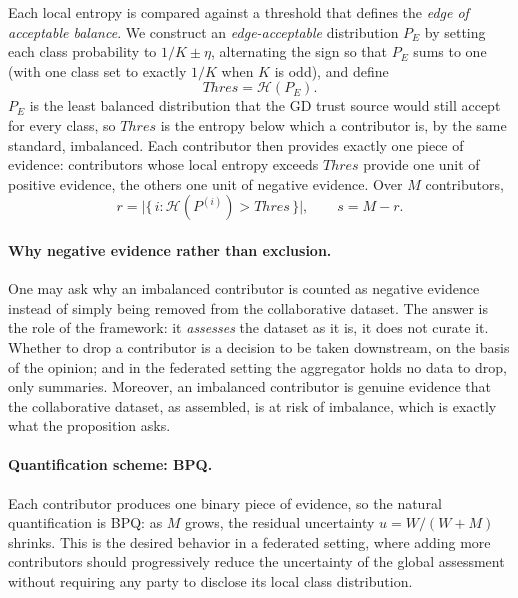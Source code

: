 Each local entropy is compared against a threshold that defines the \emph{edge of acceptable balance}. We construct an \emph{edge-acceptable} distribution $P_E$ by setting each class probability to $1/K \pm \eta$, alternating the sign so that $P_E$ sums to one (with one class set to exactly $1/K$ when $K$ is odd), and define
\begin{equation}
\mathit{Thres} = \mathcal{H}(P_E).
\end{equation}
$P_E$ is the least balanced distribution that the GD trust source would still accept for every class, so $\mathit{Thres}$ is the entropy below which a contributor is, by the same standard, imbalanced. Each contributor then provides exactly one piece of evidence: contributors whose local entropy exceeds $\mathit{Thres}$ provide one unit of positive evidence, the others one unit of negative evidence. Over $M$ contributors,
\begin{equation}
r = \bigl|\{\, i : \mathcal{H}(P^{(i)}) > \mathit{Thres} \,\}\bigr|, \qquad s = M - r.
\label{eq:gtsrb:method2-evidence}
\end{equation}

\paragraph{Why negative evidence rather than exclusion.}
One may ask why an imbalanced contributor is counted as negative evidence instead of simply being removed from the collaborative dataset. The answer is the role of the framework: it \emph{assesses} the dataset as it is, it does not curate it. Whether to drop a contributor is a decision to be taken downstream, on the basis of the opinion; and in the federated setting the aggregator holds no data to drop, only summaries. Moreover, an imbalanced contributor is genuine evidence that the collaborative dataset, as assembled, is at risk of imbalance, which is exactly what the proposition asks.

\paragraph{Quantification scheme: \ac{BPQ}.}
Each contributor produces one binary piece of evidence, so the natural quantification is \ac{BPQ}: as $M$ grows, the residual uncertainty $u = W / (W + M)$ shrinks. This is the desired behavior in a federated setting, where adding more contributors should progressively reduce the uncertainty of the global assessment without requiring any party to disclose its local class distribution.

